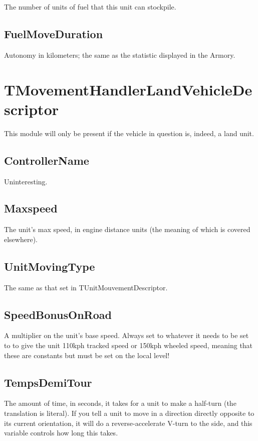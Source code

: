 \documentclass{article}
\begin{document}
The number of units of fuel that this unit can stockpile.

\subsection{FuelMoveDuration}

Autonomy in kilometers; the same as the statistic displayed in the Armory.

\section{TMovementHandlerLandVehicleDescriptor}

This module will only be present if the vehicle in question is, indeed, a land unit.

\subsection{ControllerName}

Uninteresting.

\subsection{Maxspeed}

The unit's max speed, in engine distance units (the meaning of which is covered elsewhere).

\subsection{UnitMovingType}

The same as that set in TUnitMouvementDescriptor.

\subsection{SpeedBonusOnRoad}

A multiplier on the unit's base speed. Always set to whatever it needs to be set to to give the unit 110kph tracked speed or 150kph wheeled speed, meaning that these are constants but must be set on the local level!

\subsection{TempsDemiTour}

The amount of time, in seconds, it takes for a unit to make a half-turn (the translation is literal). If you tell a unit to move in a direction directly opposite to its current orientation, it will do a reverse-accelerate V-turn to the side, and this variable controls how long this takes.
\end{document}
